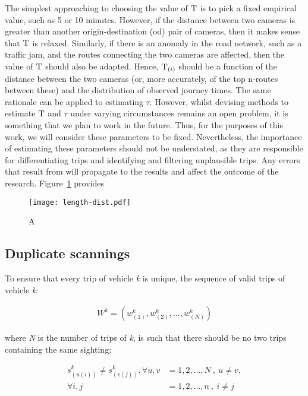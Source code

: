 The simplest approaching to choosing the value of $\mathrm{T}$ is to pick a fixed empirical value, such as 5 or 10 minutes. However, if the distance between two cameras is greater than another origin-destination (od) pair of cameras, then it makes sense that $\mathrm{T}$ is relaxed. Similarly, if there is an anomaly in the road network, such as a traffic jam, and the routes connecting the two cameras are affected, then the value of $\mathrm{T}$ should also be adapted. Hence, $\mathrm{T}_{(i)}$ should be a function of the distance between the two cameras (or, more accurately, of the top n-routes between these) and the distribution of observed journey times. The same rationale can be applied to estimating $\tau$. However, whilst devising methods to estimate $\mathrm{T}$ and $\tau$ under varying circumstances remains an open problem, it is something that we plan to work in the future. Thus, for the purposes of this work, we will consider these parameters to be fixed. Nevertheless, the importance of estimating these parameters should not be understated, as they are responsible for differentiating trips and identifying and filtering unplausible trips. Any errors that result from will propagate to the results and affect the outcome of the research. Figure~\ref{fig:length-dist} provides 

\begin{figure}[t]
  \centering
  \texttt{[image: length-dist.pdf]}
  \caption{A}
  \label{fig:length-dist}
\end{figure}

\subsection{Duplicate scannings}

To ensure that every trip of vehicle \emph{k} is unique, the sequence of valid trips of vehicle \emph{k}:

\begin{align}
W^{k} = \left( w^{k}_{(1)}, w^{k}_{(2)}, \ldots, w^{k}_{(N)} \right) \label{e.trip.history}
\end{align}

where \emph{N} is the number of trips of \emph{k}, is such that there should be no two trips containing the same sighting:

\begin{align}
s^{k}_{(u(i))} \neq s^{k}_{(v(j))}, \forall u,v &= 1, 2, \ldots, N \ , \ u \neq v,  \label{e.trip.history.constraint} \\
\forall i,j &= 1, 2, \ldots, n \ , \ i \neq j \nonumber
\end{align}

